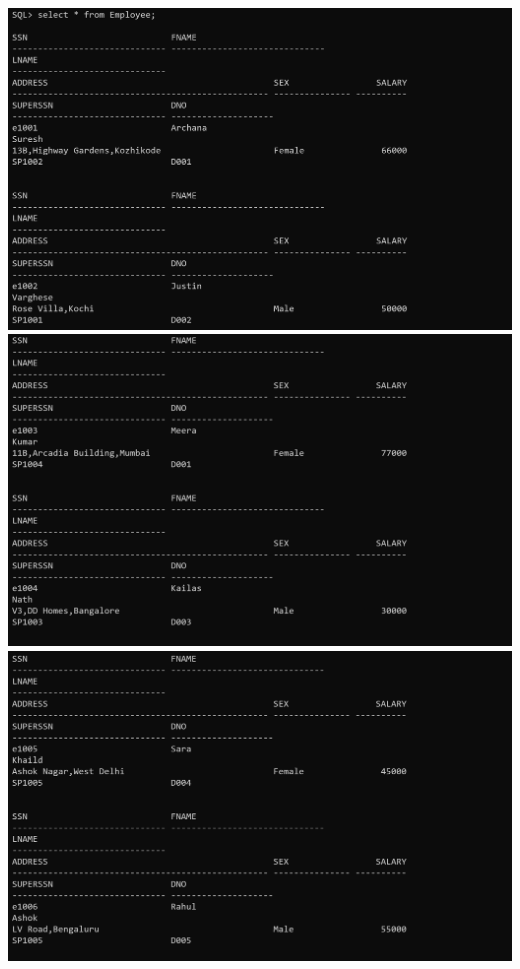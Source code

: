 \documentclass[a4paper,12pt]{report}
\begin{document}
\includegraphics[scale=0.4]{C1_op1.png}
\includegraphics[scale=0.4]{C1_op2.png}
\includegraphics[scale=0.4]{C1_op4.png}
\end{document}
